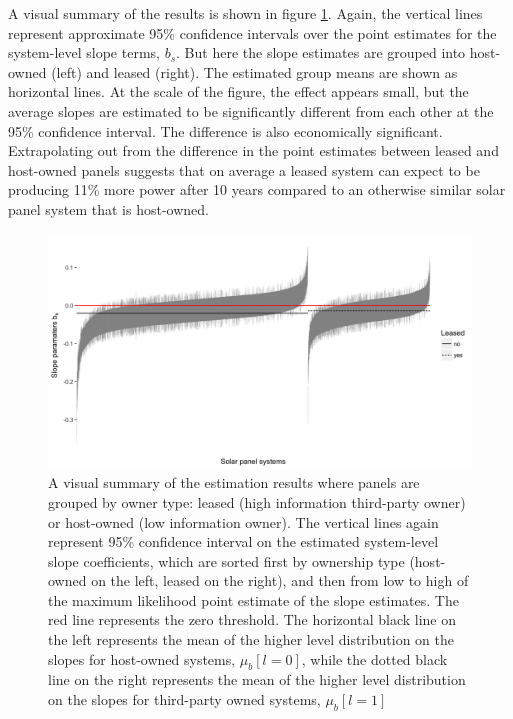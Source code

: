 \documentclass[a4paper]{article}
\begin{document}
A visual summary of the results is shown in figure \ref{lease_sys_fig}. Again, the vertical lines represent approximate 95\% confidence intervals over the point estimates for the system-level slope terms, $b_s$. But here the slope estimates are grouped into host-owned (left) and leased (right). The estimated group means are shown as horizontal lines. At the scale of the figure, the effect appears small, but the average slopes are estimated to be significantly different from each other at the 95\% confidence interval. The difference is also economically significant. Extrapolating out from the difference in the point estimates between leased and host-owned panels suggests that on average a leased system can expect to be producing 11\% more power after 10 years compared to an otherwise similar solar panel system that is host-owned.

\begin{figure}
  \centering
	\includegraphics[width=1\textwidth]{figures/lease_sys_fig.png}
	\caption{A visual summary of the estimation results where panels are grouped by owner type: leased (high information third-party owner) or host-owned (low information owner). The vertical lines again represent 95\% confidence interval on the estimated system-level slope coefficients, which are sorted first by ownership type (host-owned on the left, leased on the right), and then from low to high of the maximum likelihood point estimate of the slope estimates. The red line represents the zero threshold. The horizontal black line on the left represents the mean of the higher level distribution on the slopes for host-owned systems, $\mu_b[l=0]$, while the dotted black line on the right represents the mean of the higher level distribution on the slopes for third-party owned systems, $\mu_b[l=1]$ \label{lease_sys_fig}}

\end{figure}
\end{document}
